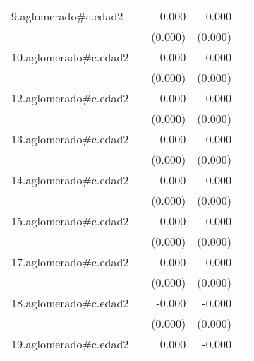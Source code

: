 {\begin{longtable}{l*{4}{D{.}{.}{-1}}}
\addlinespace
9.aglomerado#c.edad2&                     &      -0.000         &      -0.000\sym{***}&                     \\
            &                     &     (0.000)         &     (0.000)         &                     \\
\addlinespace
10.aglomerado#c.edad2&                     &       0.000         &      -0.000         &                     \\
            &                     &     (0.000)         &     (0.000)         &                     \\
\addlinespace
12.aglomerado#c.edad2&                     &       0.000         &       0.000         &                     \\
            &                     &     (0.000)         &     (0.000)         &                     \\
\addlinespace
13.aglomerado#c.edad2&                     &       0.000         &      -0.000         &                     \\
            &                     &     (0.000)         &     (0.000)         &                     \\
\addlinespace
14.aglomerado#c.edad2&                     &       0.000         &      -0.000         &                     \\
            &                     &     (0.000)         &     (0.000)         &                     \\
\addlinespace
15.aglomerado#c.edad2&                     &       0.000         &      -0.000         &                     \\
            &                     &     (0.000)         &     (0.000)         &                     \\
\addlinespace
17.aglomerado#c.edad2&                     &       0.000         &       0.000         &                     \\
            &                     &     (0.000)         &     (0.000)         &                     \\
\addlinespace
18.aglomerado#c.edad2&                     &      -0.000         &      -0.000         &                     \\
            &                     &     (0.000)         &     (0.000)         &                     \\
\addlinespace
19.aglomerado#c.edad2&                     &       0.000         &      -0.000         &                     \\

\end{longtable}}

